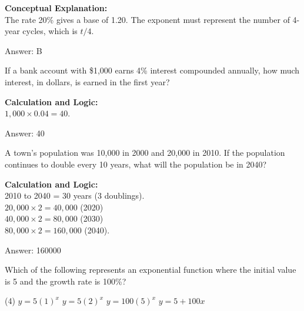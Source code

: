 \documentclass[11pt,paper=a4,answers]{exam}
\begin{document}
\begin{questions}
\begin{solution}
\textbf{Conceptual Explanation:} \\
The rate 20\% gives a base of 1.20. The exponent must represent the number of 4-year cycles, which is $t/4$.

\vspace{25pt}

Answer: \colorbox{yellow!100}{B}
\end{solution}

\vspace{40pt}

\question
If a bank account with \$1,000 earns 4\% interest compounded annually, how much interest, in dollars, is earned in the first year?

\begin{solution}
\textbf{Calculation and Logic:} \\
$1,000 \times 0.04 = 40$.

\vspace{25pt}

Answer: \colorbox{yellow!100}{40}
\end{solution}

\vspace{40pt}

\question
A town's population was 10,000 in 2000 and 20,000 in 2010. If the population continues to double every 10 years, what will the population be in 2040?

\begin{solution}
\textbf{Calculation and Logic:} \\
2010 to 2040 = 30 years (3 doublings). \\
$20,000 \times 2 = 40,000$ (2020) \\
$40,000 \times 2 = 80,000$ (2030) \\
$80,000 \times 2 = 160,000$ (2040).

\vspace{25pt}

Answer: \colorbox{yellow!100}{160000}
\end{solution}

\vspace{40pt}

\question
Which of the following represents an exponential function where the initial value is 5 and the growth rate is 100\%?
\begin{tasks}(4)
    \task $y = 5(1)^x$
    \task $y = 5(2)^x$
    \task $y = 100(5)^x$
    \task $y = 5 + 100x$
\end{tasks}


\end{questions}
\end{document}
